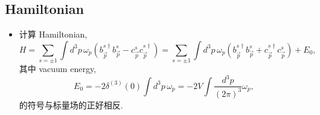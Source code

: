 \subsection{Hamiltonian}
\begin{itemize}
	\item 计算 Hamiltonian,
	\begin{equation}
		H = \sum_{s = \pm 1} \int d^3 p \, \omega_p (b^{s \dag}_{\vec{p}} b^s_{\vec{p}} - c^s_{\vec{p}} c^{s \dag}_{\vec{p}}) = \sum_{s = \pm 1} \int d^3 p \, \omega_p (b^{s \dag}_{\vec{p}} b^s_{\vec{p}} + c^{s \dag}_{\vec{p}} c^s_{\vec{p}}) + E_0,
	\end{equation}
	其中 vacuum energy,
	\begin{equation} \label{8.4.2}
		E_0 = - 2 \delta^{(3)}(0) \int d^3 p \, \omega_p = - 2 V \int \frac{d^3 p}{(2 \pi)^3} \omega_p,
	\end{equation}
	的符号与标量场的正好相反.
	

\end{itemize}
